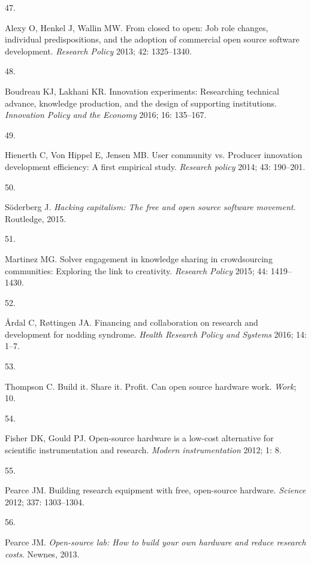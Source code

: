 \documentclass[
  12pt,
  a4paperpaper,
  onecolumn]{article}
\newlength{\cslhangindent}
\newlength{\csllabelwidth}
\newlength{\cslentryspacingunit} %
\newenvironment{CSLReferences}[2] %
 {%
  \setlength{\parindent}{0pt}
  \ifodd #1
  \let\oldpar\par
  \def\par{\hangindent=\cslhangindent\oldpar}
  \fi
  \setlength{\parskip}{#2\cslentryspacingunit}
 }%
 {}
\newcommand{\CSLLeftMargin}[1]{\parbox[t]{\csllabelwidth}{#1}}
\newcommand{\CSLRightInline}[1]{\parbox[t]{\linewidth - \csllabelwidth}{#1}\break}
\begin{document}
\begin{CSLReferences}{0}{0}
\leavevmode{}%
\CSLLeftMargin{47. }%
\CSLRightInline{Alexy O, Henkel J, Wallin MW. From closed to open: Job
role changes, individual predispositions, and the adoption of commercial
open source software development. \emph{Research Policy} 2013; 42:
1325--1340.}

\leavevmode{}%
\CSLLeftMargin{48. }%
\CSLRightInline{Boudreau KJ, Lakhani KR. Innovation experiments:
Researching technical advance, knowledge production, and the design of
supporting institutions. \emph{Innovation Policy and the Economy} 2016;
16: 135--167.}

\leavevmode{}%
\CSLLeftMargin{49. }%
\CSLRightInline{Hienerth C, Von Hippel E, Jensen MB. User community vs.
Producer innovation development efficiency: A first empirical study.
\emph{Research policy} 2014; 43: 190--201.}

\leavevmode{}%
\CSLLeftMargin{50. }%
\CSLRightInline{Söderberg J. \emph{Hacking capitalism: The free and open
source software movement}. Routledge, 2015.}

\leavevmode{}%
\CSLLeftMargin{51. }%
\CSLRightInline{Martinez MG. Solver engagement in knowledge sharing in
crowdsourcing communities: Exploring the link to creativity.
\emph{Research Policy} 2015; 44: 1419--1430.}

\leavevmode{}%
\CSLLeftMargin{52. }%
\CSLRightInline{Årdal C, Røttingen JA. {Financing and collaboration on
research and development for nodding syndrome}. \emph{Health Research
Policy and Systems} 2016; 14: 1--7.}

\leavevmode{}%
\CSLLeftMargin{53. }%
\CSLRightInline{Thompson C. Build it. Share it. Profit. Can open source
hardware work. \emph{Work}; 10.}

\leavevmode{}%
\CSLLeftMargin{54. }%
\CSLRightInline{Fisher DK, Gould PJ. Open-source hardware is a low-cost
alternative for scientific instrumentation and research. \emph{Modern
instrumentation} 2012; 1: 8.}

\leavevmode{}%
\CSLLeftMargin{55. }%
\CSLRightInline{Pearce JM. Building research equipment with free,
open-source hardware. \emph{Science} 2012; 337: 1303--1304.}

\leavevmode{}%
\CSLLeftMargin{56. }%
\CSLRightInline{Pearce JM. \emph{Open-source lab: How to build your own
hardware and reduce research costs}. Newnes, 2013.}


\end{CSLReferences}
\end{document}
